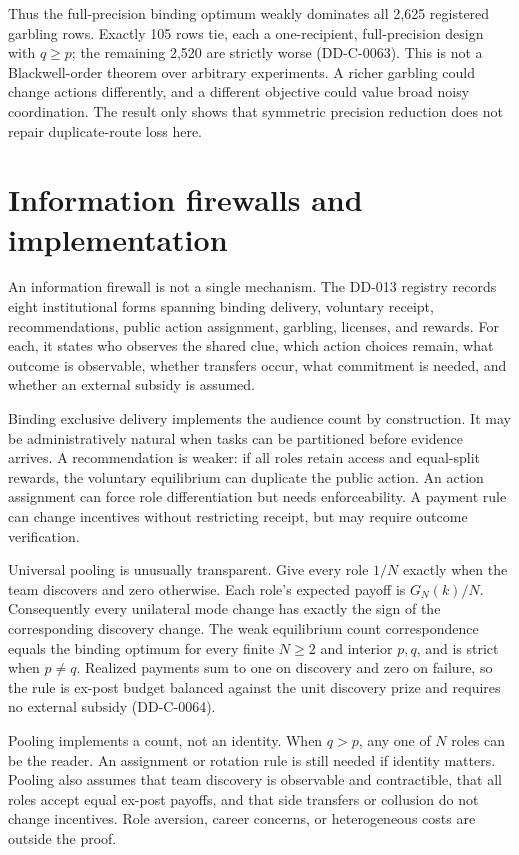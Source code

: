 \documentclass[11pt]{article}
\begin{document}
Thus the full-precision binding optimum weakly dominates all 2,625 registered
garbling rows. Exactly 105 rows tie, each a one-recipient, full-precision design
with $q\geq p$; the remaining 2,520 are strictly worse (DD-C-0063). This is not
a Blackwell-order theorem over arbitrary experiments. A richer garbling could
change actions differently, and a different objective could value broad noisy
coordination. The result only shows that symmetric precision reduction does not
repair duplicate-route loss here.



\section{Information firewalls and implementation}

An information firewall is not a single mechanism. The DD-013 registry records
eight institutional forms spanning binding delivery, voluntary receipt,
recommendations, public action assignment, garbling, licenses, and rewards.
For each, it states who observes the shared clue, which action choices remain,
what outcome is observable, whether transfers occur, what commitment is needed,
and whether an external subsidy is assumed.

Binding exclusive delivery implements the audience count by construction. It
may be administratively natural when tasks can be partitioned before evidence
arrives. A recommendation is weaker: if all roles retain access and equal-split
rewards, the voluntary equilibrium can duplicate the public action. An action
assignment can force role differentiation but needs enforceability. A payment
rule can change incentives without restricting receipt, but may require outcome
verification.

Universal pooling is unusually transparent. Give every role $1/N$ exactly when
the team discovers and zero otherwise. Each role's expected payoff is
$G_N(k)/N$. Consequently every unilateral mode change has exactly the sign of
the corresponding discovery change. The weak equilibrium count correspondence
equals the binding optimum for every finite $N\geq2$ and interior $p,q$, and is
strict when $p\ne q$. Realized payments sum to one on discovery and zero on
failure, so the rule is ex-post budget balanced against the unit discovery
prize and requires no external subsidy (DD-C-0064).

Pooling implements a count, not an identity. When $q>p$, any one of $N$ roles
can be the reader. An assignment or rotation rule is still needed if identity
matters. Pooling also assumes that team discovery is observable and contractible,
that all roles accept equal ex-post payoffs, and that side transfers or collusion
do not change incentives. Role aversion, career concerns, or heterogeneous
costs are outside the proof.
\end{document}
